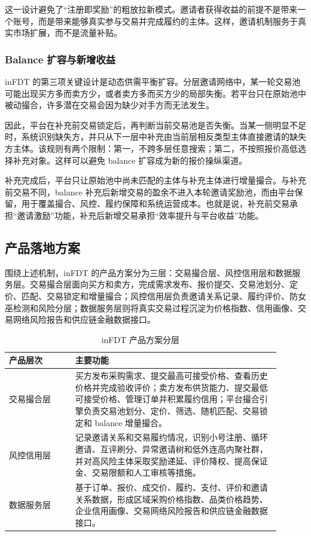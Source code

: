 \documentclass[UTF8,a4paper,12pt]{ctexart}
\begin{document}
这一设计避免了“注册即奖励”的粗放拉新模式。邀请者获得收益的前提不是带来一个账号，而是带来能够真实参与交易并完成履约的主体。这样，邀请机制服务于真实市场扩展，而不是流量补贴。

\subsubsection{Balance 扩容与新增收益}

inFDT 的第三项关键设计是动态供需平衡扩容。分层邀请网络中，某一轮交易池可能出现买方多而卖方少，或者卖方多而买方少的局部失衡。若平台只在原始池中被动撮合，许多潜在交易会因为缺少对手方而无法发生。

因此，平台在补充前交易锁定后，再判断当前交易池是否失衡。当某一侧明显不足时，系统识别缺失方，并只从下一层中补充由当前层相反类型主体直接邀请的缺失方主体。该规则有两个限制：第一，不跨多层任意搜索；第二，不按照报价高低选择补充对象。这样可以避免 balance 扩容成为新的报价操纵渠道。

补充完成后，平台只让原始池中尚未匹配的主体与补充主体进行增量撮合。与补充前交易不同，balance 补充后新增交易的盈余不进入本轮邀请奖励池，而由平台保留，用于覆盖撮合、风控、履约保障和系统运营成本。也就是说，补充前交易承担“邀请激励”功能，补充后新增交易承担“效率提升与平台收益”功能。

\subsection{产品落地方案}

围绕上述机制，inFDT 的产品方案分为三层：交易撮合层、风控信用层和数据服务层。交易撮合层面向买方和卖方，完成需求发布、报价提交、交易池划分、定价、匹配、交易锁定和增量撮合；风控信用层负责邀请关系记录、履约评价、防女巫检测和风险分层；数据服务层则将真实交易过程沉淀为价格指数、信用画像、交易网络风险报告和供应链金融数据接口。

\begin{table}[htbp]
    \centering
    \renewcommand{\arraystretch}{1.25}
    \begin{tabular}{p{0.22\linewidth}p{0.68\linewidth}}
        \hline
        \textbf{产品层次} & \textbf{主要功能}                                                                                                \\
        \hline
        交易撮合层         & 买方发布采购需求、提交最高可接受价格、查看历史价格并完成验收评价；卖方发布供货能力、提交最低可接受价格、管理订单并积累履约信用；平台撮合引擎负责交易池划分、定价、筛选、随机匹配、交易锁定和 balance 增量撮合。 \\
        风控信用层         & 记录邀请关系和交易履约情况，识别小号注册、循环邀请、互评刷分、异常邀请树和低外连高内聚社群，并对高风险主体采取奖励递延、评价降权、提高保证金、交易限额和人工审核等措施。                         \\
        数据服务层         & 基于订单、报价、成交价、履约、支付、评价和邀请关系数据，形成区域采购价格指数、品类价格趋势、企业信用画像、交易网络风险报告和供应链金融数据接口。                                     \\
        \hline
    \end{tabular}
    \caption{inFDT 产品方案分层}
\end{table}
\end{document}
